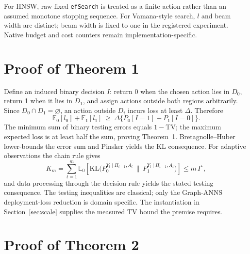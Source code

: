 \documentclass{article}
\newcommand{\TV}{\mathrm{TV}}
\newcommand{\KL}{\mathrm{KL}}
\newcommand{\E}{\mathbb{E}}
\begin{document}
For HNSW, raw fixed \texttt{efSearch} is treated as a finite action rather than an assumed monotone
stopping sequence. For Vamana-style search, $l$ and beam width are distinct; beam width is fixed to one in
the registered experiment. Native budget and cost counters remain implementation-specific.

\section{Proof of Theorem 1}
\label{app:proof1}

Define an induced binary decision $I$: return 0 when the chosen action lies in $D_0$, return 1 when it lies
in $D_1$, and assign actions outside both regions arbitrarily. Since $D_0\cap D_1=\varnothing$, an action
outside $D_i$ incurs loss at least $\Delta$. Therefore
\begin{equation}
\E_{0}[l_{0}]+\E_{1}[l_{1}]\ \ge\ \Delta\bigl\{P_{0}[I{=}1]+P_{1}[I{=}0]\bigr\}.
\label{eq:proof1}
\end{equation}
The minimum sum of binary testing errors equals $1-\TV$; the maximum expected loss is at least half the sum,
proving Theorem~1. Bretagnolle--Huber lower-bounds the error sum and Pinsker yields the KL consequence.
For adaptive observations the chain rule gives
\begin{equation}
K_{m}=\sum_{t=1}^{m}\E_{0}\!\left[\KL\bigl(P_{0}^{Y_{t}\mid H_{t-1},A_{t}}\,\bigl\|\,P_{1}^{Y_{t}\mid H_{t-1},A_{t}}\bigr)\right]\le m\,I^{\star},
\label{eq:chain}
\end{equation}
and data processing through the decision rule yields the stated testing consequence. The testing
inequalities are classical; only the Graph-ANNS deployment-loss reduction is domain specific. The
instantiation in Section~\ref{sec:scale} supplies the measured TV bound the premise requires.

\section{Proof of Theorem 2}
\label{app:proof2}
\end{document}

